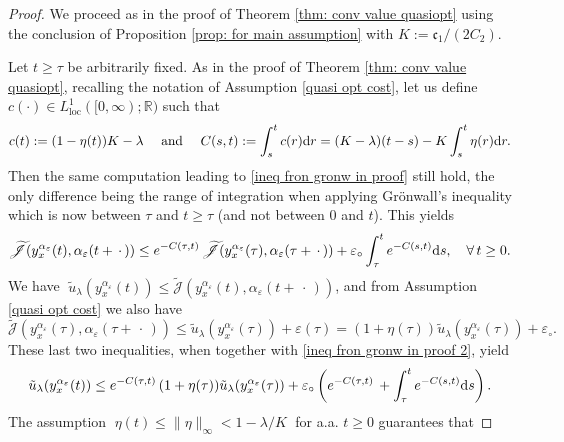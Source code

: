 \documentclass[12pt]{amsart}
\newcommand{\D}[1]{\mbox{\rm #1}}
\newcommand{\dd}{\D{d}}
\numberwithin{equation}{section}
\theoremstyle{plain}
\begin{document}
\begin{proof}
We proceed as in the proof of Theorem \ref{thm: conv value quasiopt} using the conclusion of Proposition \ref{prop: for main assumption} with $K:= \mathfrak{c}_{1}/(2C_{2})$.

Let $t\geq \tau$ be arbitrarily fixed. 
As in the proof of Theorem \ref{thm: conv value quasiopt}, recalling the notation of Assumption \ref{quasi opt cost}, let us define $c(\cdot)\in L^{1}_{\text{loc}}([0,\infty);\mathbb{R})$ such that 
\begin{equation*}
    c(t):=(1-\eta(t))K-\lambda \quad \text{ and } \quad C(s,t) := \int_{s}^{t}c(r)\dd r = (K-\lambda)(t-s) - K\int_{s}^{t}\eta(r)\dd r.
\end{equation*} 
Then the same computation leading to \eqref{ineq fron gronw in proof} still hold, the only difference being the range of integration when applying Gr\"onwall's inequality which is now between $\tau$ and $t\geq\tau$ (and not between $0$ and $t$). This yields 
\begin{equation}\label{ineq fron gronw in proof 2}
    \widetilde{\mathscr{J}}(y_{x}^{\alpha_{\varepsilon}}(t),\alpha_{\varepsilon}(t+\,\cdot\,)) \leq e^{-C(\tau,t)}\,\widetilde{\mathscr{J}}(y_{x}^{\alpha_{\varepsilon}}(\tau),\alpha_{\varepsilon}(\tau+\,\cdot\,)) + \varepsilon_{\circ} \int_{\tau}^{t}e^{-C(s,t)}\dd s, \quad \forall\,t\geq0.
\end{equation}
We have $\;\tilde{u}_{\lambda}(y_{x}^{\alpha_{\varepsilon}}(t)) \leq \widetilde{\mathscr{J}}(y_{x}^{\alpha_{\varepsilon}}(t),\alpha_{\varepsilon}(t+\,\cdot\,))$,\; and from Assumption \ref{quasi opt cost} we also have 
\begin{equation*}
   \widetilde{\mathscr{J}}(y_{x}^{\alpha_{\varepsilon}}(\tau),\alpha_{\varepsilon}(\tau+\,\cdot\,)) \leq \tilde{u}_{\lambda}(y_{x}^{\alpha_{\varepsilon}}(\tau)) + \varepsilon(\tau) = (1+\eta(\tau))\tilde{u}_{\lambda}(y_{x}^{\alpha_{\varepsilon}}(\tau)) + \varepsilon_{\circ}.
\end{equation*}
These last two inequalities, when together with \eqref{ineq fron gronw in proof 2}, yield
\begin{equation}\label{ineq quasi opt value in proof 2}
    \tilde{u}_{\lambda}(y_{x}^{\alpha_{\varepsilon}}(t)) \leq e^{-C(\tau,t)}\,(1+\eta(\tau))\tilde{u}_{\lambda}(y_{x}^{\alpha_{\varepsilon}}(\tau)) + \varepsilon_{\circ} \left(e^{-C(\tau,t)}\,+\int_{\tau}^{t}e^{-C(s,t)}\dd s\right).
\end{equation}
The assumption $\;\eta(t)\leq \|\eta\|_{\infty}< 1- \lambda/K\;$ for a.a. $t\geq 0$ guarantees that 

\end{proof}
\end{document}
